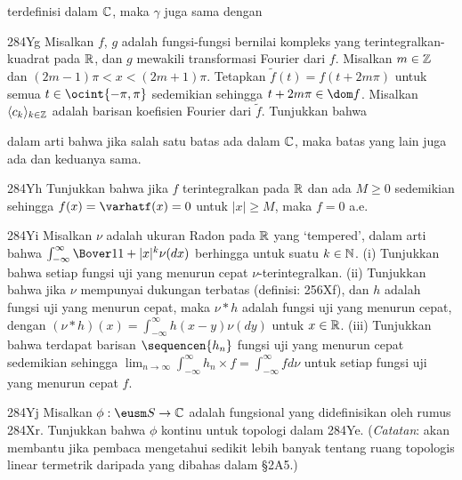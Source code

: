 {

\noindent terdefinisi dalam $\Bbb C$, maka $\gamma$ juga sama dengan


\spheader 284Yg Misalkan $f$, $g$ adalah fungsi-fungsi bernilai kompleks yang
terintegralkan-kuadrat pada $\Bbb R$, dan $g$ mewakili transformasi Fourier
dari $f$. Misalkan $m\in\Bbb Z$ dan $(2m-1)\pi<x<(2m+1)\pi$. Tetapkan
$\tilde f(t)=f(t+2m\pi)$ untuk semua $t\in\ocint{-\pi,\pi}$ sedemikian sehingga
$t+2m\pi\in\dom f$. Misalkan $\langle c_k\rangle_{k\in\Bbb Z}$ adalah barisan
koefisien Fourier dari $\tilde f$. Tunjukkan bahwa


\noindent dalam arti bahwa jika salah satu batas ada dalam $\Bbb C$, maka batas
yang lain juga ada dan keduanya sama.  %

\spheader 284Yh Tunjukkan bahwa jika $f$ terintegralkan pada $\Bbb R$ dan ada
$M\ge 0$ sedemikian sehingga $f(x)=\varhatf(x)=0$ untuk $|x|\ge M$, maka
$f=0$ a.e. 

\spheader 284Yi Misalkan $\nu$ adalah ukuran Radon pada $\Bbb R$ yang
`tempered', dalam arti bahwa
$\int_{-\infty}^{\infty}\Bover1{1+|x|^k}\nu(dx)$ berhingga untuk suatu
$k\in\Bbb N$. (i) Tunjukkan bahwa setiap fungsi uji yang menurun cepat
$\nu$-terintegralkan. (ii) Tunjukkan bahwa jika $\nu$ mempunyai dukungan
terbatas (definisi: 256Xf), dan $h$ adalah fungsi uji yang menurun cepat, maka
$\nu*h$ adalah fungsi uji yang menurun cepat, dengan
$(\nu*h)(x)=\int_{-\infty}^{\infty}h(x-y)\nu(dy)$ untuk $x\in\Bbb R$. (iii)
Tunjukkan bahwa terdapat barisan $\sequencen{h_n}$ fungsi uji yang menurun
cepat sedemikian sehingga
$\lim_{n\to\infty}\int_{-\infty}^{\infty}h_n\times f
=\int_{-\infty}^{\infty}fd\nu$ untuk setiap fungsi uji yang menurun cepat
$f$. %

\spheader 284Yj Misalkan $\phi:\eusm S\to\Bbb C$ adalah fungsional yang
didefinisikan oleh rumus 284Xr. Tunjukkan bahwa $\phi$ kontinu untuk topologi
dalam 284Ye. ({\it Catatan\/}: akan membantu jika pembaca mengetahui sedikit
lebih banyak tentang ruang topologis linear termetrik daripada yang dibahas
dalam \S2A5.) %

}%

